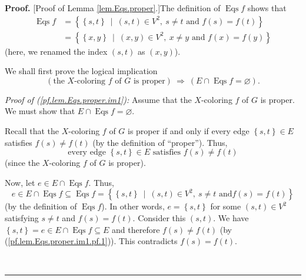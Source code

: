 \documentclass[numbers=enddot,12pt,final,onecolumn,notitlepage]{scrartcl}%
\theoremstyle{definition}
\newenvironment{proof}[1][Proof]{\noindent\textbf{#1.} }{\ \rule{0.5em}{0.5em}}
\newenvironment{verlong}{}{}
\begin{document}
\begin{verlong}
\begin{proof}
[Proof of Lemma \ref{lem.Eqs.proper}.]The definition of $\operatorname*{Eqs}f$
shows that%
\begin{align}
\operatorname*{Eqs}f  &  =\left\{  \left\{  s,t\right\}  \ \mid\ \left(
s,t\right)  \in V^{2},\ s\neq t\text{ and }f\left(  s\right)  =f\left(
t\right)  \right\} \nonumber\\
&  =\left\{  \left\{  x,y\right\}  \ \mid\ \left(  x,y\right)  \in
V^{2},\ x\neq y\text{ and }f\left(  x\right)  =f\left(  y\right)  \right\}
\label{pf.lem.Eqs.proper.0}%
\end{align}
(here, we renamed the index $\left(  s,t\right)  $ as $\left(  x,y\right)  $).

We shall first prove the logical implication%
\begin{equation}
\left(  \text{the }X\text{-coloring }f\text{ of }G\text{ is proper}\right)
\ \Longrightarrow\ \left(  E\cap\operatorname*{Eqs}f=\varnothing\right)  .
\label{pf.lem.Eqs.proper.im1}%
\end{equation}


\textit{Proof of (\ref{pf.lem.Eqs.proper.im1}):} Assume that the $X$-coloring
$f$ of $G$ is proper. We must show that $E\cap\operatorname*{Eqs}%
f=\varnothing$.

Recall that the $X$-coloring $f$ of $G$ is proper if and only if every edge
$\left\{  s,t\right\}  \in E$ satisfies $f\left(  s\right)  \neq f\left(
t\right)  $ (by the definition of \textquotedblleft proper\textquotedblright).
Thus,%
\begin{equation}
\text{every edge }\left\{  s,t\right\}  \in E\text{ satisfies }f\left(
s\right)  \neq f\left(  t\right)  \label{pf.lem.Eqs.proper.im1.pf.1}%
\end{equation}
(since the $X$-coloring $f$ of $G$ is proper).

Now, let $e\in E\cap\operatorname*{Eqs}f$. Thus,%
\[
e\in E\cap\operatorname*{Eqs}f\subseteq\operatorname*{Eqs}f=\left\{  \left\{
s,t\right\}  \ \mid\ \left(  s,t\right)  \in V^{2},\ s\neq t\text{ and
}f\left(  s\right)  =f\left(  t\right)  \right\}
\]
(by the definition of $\operatorname*{Eqs}f$). In other words, $e=\left\{
s,t\right\}  $ for some $\left(  s,t\right)  \in V^{2}$ satisfying $s\neq t$
and $f\left(  s\right)  =f\left(  t\right)  $. Consider this $\left(
s,t\right)  $. We have $\left\{  s,t\right\}  =e\in E\cap\operatorname*{Eqs}%
f\subseteq E$ and therefore $f\left(  s\right)  \neq f\left(  t\right)  $ (by
(\ref{pf.lem.Eqs.proper.im1.pf.1})). This contradicts $f\left(  s\right)
=f\left(  t\right)  $.


\end{proof}
\end{verlong}
\end{document}
